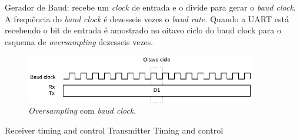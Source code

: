 	Gerador de Baud: recebe um \textit{clock} de entrada e o divide para gerar o \textit{baud clock}. A frequência do \textit{baud clock} é dezesseis vezes o \textit{baud rate.} Quando a UART está recebendo o bit de entrada é amostrado no oitavo ciclo do baud clock para o esquema de \textit{oversampling} dezesseis vezes.
	
	\begin{figure}[h]
		\caption{\label{figure:uart-txrx}\textit{Oversampling} com \textit{baud clock}.}
		\centering
		\includegraphics[width=0.9\textwidth]{uart/txrx.pdf}
	\end{figure}
	
	
	
	Receiver timing and control
	Transmitter Timing and control
	
